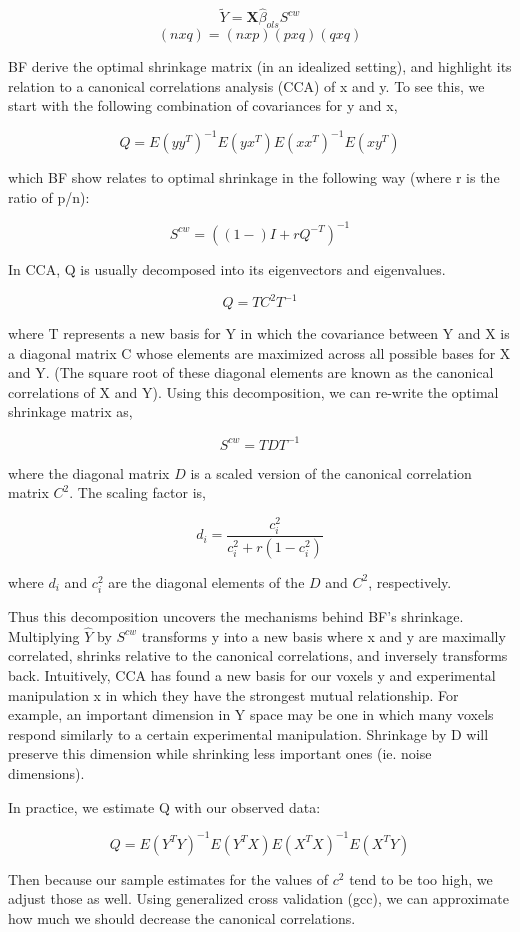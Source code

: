 \documentclass{article}
\begin{document}
\[  \tilde Y= \textbf{X} \hat \beta_{ols} S^{cw} \]
$$ (nxq) = (nxp)(pxq)(qxq) $$

BF derive the optimal shrinkage matrix (in an idealized setting), and
highlight its relation to a canonical correlations analysis (CCA) of x
and y. To see this, we start with the following combination of
covariances for y and x,

\[ Q = E(yy^T)^{-1}E(yx^T)E(xx^T)^{-1}E(xy^T) \]

which BF show relates to optimal shrinkage in the following way (where r
is the ratio of p/n):

\[ S^{cw} = ((1-)I+rQ^{-T})^{-1} \]

In CCA, Q is usually decomposed into its eigenvectors and eigenvalues.

\[ Q = T C^2 T^{-1} \]

where T represents a new basis for Y in which the covariance between Y
and X is a diagonal matrix C whose elements are maximized across all
possible bases for X and Y. (The square root of these diagonal elements are known as the canonical
correlations of X and Y). Using this decomposition, we can re-write the optimal shrinkage matrix
as,

\[ S^{cw} = T D T^{-1} \] 

where the diagonal matrix $D$ is a scaled version of the canonical correlation matrix $C^2$. The scaling factor is, 

\[ d_i = \frac{c_i^2}{c_i^2 + r(1-c_i^2)} \]

 where $d_i$ and $ c_i^{2} $ are the diagonal elements of the $D$ and $ C^2 $, respectively.


Thus this decomposition uncovers the mechanisms behind BF's shrinkage.
Multiplying \(\hat Y\) by $ S^{cw} $
transforms y into a new basis where x and y are maximally correlated,
shrinks relative to the canonical correlations, and inversely transforms
back. Intuitively, CCA has found a new basis for our voxels y and
experimental manipulation x in which they have the strongest mutual
relationship. For example, an important dimension in Y space may be one
in which many voxels respond similarly to a certain experimental
manipulation. Shrinkage by D will preserve this dimension while
shrinking less important ones (ie. noise dimensions).

In practice, we estimate Q with our observed data:

\[ Q = E(Y^T Y)^{-1}E(Y^T X)E(X^T X)^{-1}E(X^T Y) \]

Then because our sample estimates for the values of $ c^{2} $ tend to
be too high, we adjust those as well. Using generalized cross
validation (gcc), we can approximate how much we should decrease the canonical
correlations.
\end{document}
